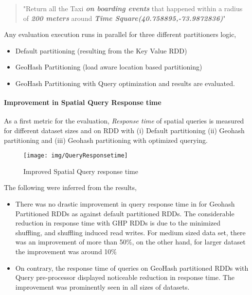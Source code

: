 \documentclass[article,type=msc,colorback,12pt,accentcolor=tud1d]{tudthesis}
\begin{document}
		  \begin{quote}
		  	"Return all the Taxi \textbf{\textit{on boarding events}} that happened within a radius of \textbf{\textit{200 meters}} around \textbf{\textit{Time Square(40.758895,-73.9872836)}}"
		  \end{quote}
		  
		  Any evaluation execution runs in parallel for three different partitioners logic,
		  \begin{itemize} 
		  	\label{typesofevalset}
		  	\item Default partitioning (resulting from the Key Value RDD)
		  \item GeoHash Partitioning (load aware location based partitioning)
		  \item GeoHash Partitioning with Query optimization
		  and results are evaluated. 
		  
		  \end{itemize}
		  
		  \clearpage
			  \paragraph{Improvement in Spatial Query Response time}
		  	  
		  	  As a first metric for the evaluation, \textit{Response time }of spatial queries is measured for different dataset sizes and on RDD with (i) Default partitioning (ii) Geohash partitioning and (iii) Geohash partitioning with optimized querying.
		  	   	  
				\begin{figure}[h]
				\centering
				\texttt{[image: img/QueryResponsetime]}
				\caption{Improved Spatial Query response time}
				\label{fig:queryresponsetime}
				\end{figure}
				
				The following were inferred from the results, 
				\begin{itemize}
					\item There was no drastic improvement in query response time in for Geohash Partitioned RDDs as against default partitioned RDDs. The considerable reduction in response time with GHP RDDs is due to the minimized shuffling, and shuffling induced read writes. For medium sized data set, there was an improvement of more than 50\%, on the other hand, for larger dataset the improvement was around 10\%
					\item On contrary, the response time of queries on GeoHash partitioned RDDs with Query pre-processor displayed noticeable reduction in response time. The improvement was prominently seen in all sizes of datasets.
				\end{itemize}
				
\end{document}
